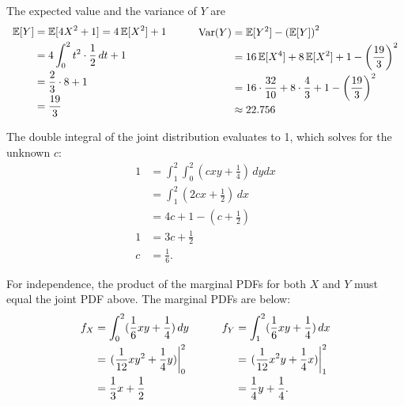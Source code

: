 \documentclass[11pt]{article}
\begin{document}
\begin{solution}
\begin{Parts}
The expected value and the variance of $Y$ are
\[
    \begin{array}{c@{\hspace{3em}}c}
        \begin{split}
            \E[Y] &= \E[4X^2+1] = 4\E[X^2] + 1 \\
            &= 4 \int_{0}^{2} t^2 \cdot \frac{1}{2} \, dt + 1 \\
            &= \frac{2}{3} \cdot 8 + 1 \\
            &= \frac{19}{3}
        \end{split}
        &
        \begin{split}
            \Var(Y) &= \E[Y^2] - \left( \E[Y] \right)^2 \\
            &= 16 \E[X^4] + 8 \E[X^2] + 1 - \left( \frac{19}{3} \right)^2 \\
            &= 16 \cdot \frac{32}{10} + 8 \cdot \frac{4}{3} + 1 - \left( \frac{19}{3} \right)^2 \\
            & \approx 22.756
        \end{split}
    \end{array}
\]

\Part The double integral of the joint distribution evaluates to 1, which
solves for the unknown $c$:
\[
    \begin{split}
        1 &= \int_{1}^{2} \int_{0}^{2} (cxy + \frac{1}{4}) \, dy dx \\
        &= \int_{1}^{2} (2cx + \frac{1}{2}) \, dx \\
        &= 4c + 1 - \left( c + \frac{1}{2} \right) \\
        1 &= 3c + \frac{1}{2} \\
        c &= \frac{1}{6}.
    \end{split}
\]

For independence, the product of the marginal PDFs for both $X$ and $Y$ must
equal the joint PDF above. The marginal PDFs are below: 
\[
    \begin{array}{c@{\hspace{3em}}c}
        \begin{split}
            f_X &= \int_{0}^{2} (\frac{1}{6}xy + \frac{1}{4}) \, dy \\
            &= \left. (\frac{1}{12}xy^2 + \frac{1}{4}y) \right|_0^2 \\
            &= \frac{1}{3}x + \frac{1}{2}
        \end{split}
        &
        \begin{split}
            f_Y &= \int_{1}^{2} (\frac{1}{6}xy + \frac{1}{4}) \, dx \\
            &= \left. (\frac{1}{12}x^2y+\frac{1}{4}x) \right|_1^2 \\
            &= \frac{1}{4}y + \frac{1}{4}.
        \end{split}
    \end{array}
\]


\end{Parts}
\end{solution}
\end{document}
